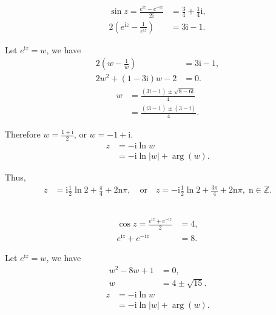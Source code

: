 \documentclass[12pt]{article}
\newcommand{\mrm}[1]{\mathrm{#1}}
\begin{document}
\section{}
\subsection{}
\begin{align*}
\sin z = \frac{e^{\mrm iz} - e^{-\mrm iz}}{2\mathrm{i}} &= \frac{3}{4} + \frac{1}{4}\mathrm{i}, \\
2\left(e^{\mrm iz} - \frac{1}{e^{\mrm iz}}\right) &= 3\mathrm{i} - 1.
\end{align*}

Let \(e^{\mrm iz} = w\), we have
\begin{align*}
2\left(w - \frac{1}{w}\right) &= 3\mathrm{i} - 1, \\
2w^2 + (1 - 3\mathrm{i})w - 2 &= 0.
\end{align*}
\begin{align*}
w &= \frac{(3\mathrm{i} - 1) \pm \sqrt{8 - 6\mathrm{i}}}{4} \\
&= \frac{(\mathrm{i}3 - 1) \pm (3 - \mathrm{i})}{4}.
\end{align*}

Therefore \(w = \frac{1+\mathrm{i}}{2}\), or \(w = -1+\mathrm{i}\).
\begin{align*}
z &= -\mathrm{i}\ln w \\
&= -\mathrm{i}\ln|w| + \arg(w).
\end{align*}

Thus,
\begin{align*}
z &= \mathrm{i}\frac{1}{2}\ln 2 + \frac{\pi}{4} + 2\mrm n\pi, \quad \text{or} \quad z = -\mathrm{i}\frac{1}{2}\ln 2 + \frac{3\pi}{4} + 2\mrm n\pi,\;\mrm n \in \mathbb{Z}.
\end{align*}
\subsection{}
\begin{align*}
\cos z = \frac{e^{\mrm iz} + e^{-\mrm iz}}{2} &= 4, \\
e^{\mrm iz} + e^{-\mrm iz} &= 8.
\end{align*}

Let \(e^{\mrm iz} = w\), we have
\begin{align*}
w^2 - 8w + 1 &= 0, \\
w &= 4 \pm \sqrt{15}.
\end{align*}
\begin{align*}
z &= -\mathrm{i}\ln w \\
&= -\mathrm{i}\ln|w| + \arg(w).
\end{align*}
\end{document}
